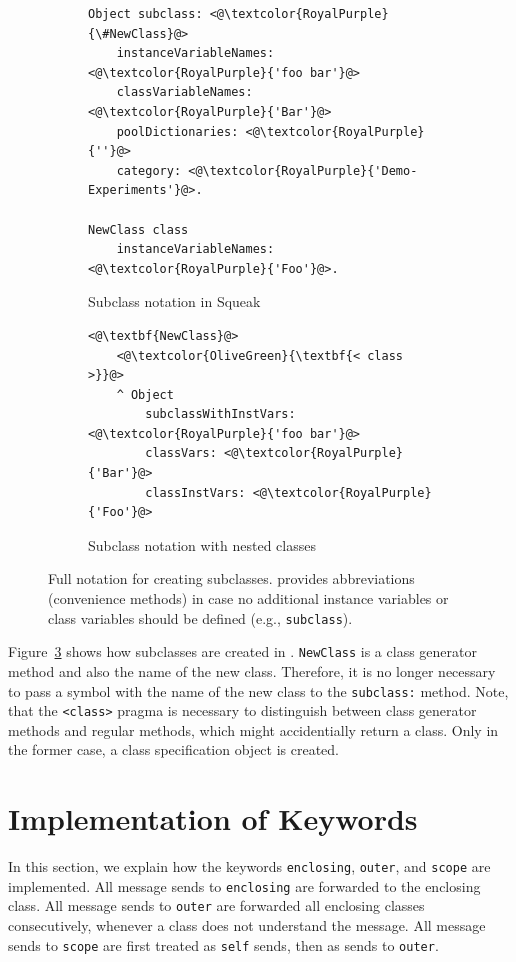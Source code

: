 \begin{figure}[!htp]
\begin{subfigure}[b]{\textwidth}
\begin{lstlisting}
Object subclass: <@\textcolor{RoyalPurple}{\#NewClass}@>
    instanceVariableNames: <@\textcolor{RoyalPurple}{'foo bar'}@>
    classVariableNames: <@\textcolor{RoyalPurple}{'Bar'}@>
    poolDictionaries: <@\textcolor{RoyalPurple}{''}@>
    category: <@\textcolor{RoyalPurple}{'Demo-Experiments'}@>.

NewClass class
	instanceVariableNames: <@\textcolor{RoyalPurple}{'Foo'}@>.
\end{lstlisting}
\caption{Subclass notation in Squeak}
\label{fig:impl_subclass_squeak}
\end{subfigure}

\vspace{15pt}

\begin{subfigure}[b]{\textwidth}
\begin{lstlisting}
<@\textbf{NewClass}@>
    <@\textcolor{OliveGreen}{\textbf{< class >}}@>
    ^ Object 
        subclassWithInstVars: <@\textcolor{RoyalPurple}{'foo bar'}@>
        classVars: <@\textcolor{RoyalPurple}{'Bar'}@>
        classInstVars: <@\textcolor{RoyalPurple}{'Foo'}@>
\end{lstlisting}
\caption{Subclass notation with nested classes}
\label{fig:impl_subclass_nested}
\end{subfigure}
\caption[Notation for creating subclasses]{Full notation for creating subclasses. \msname provides abbreviations (convenience methods) in case no additional instance variables or class variables should be defined (e.g., \texttt{subclass}).}
\end{figure}

Figure~\ref{fig:impl_subclass_nested} shows how subclasses are created in \msname. \texttt{NewClass} is a class generator method and also the name of the new class. Therefore, it is no longer necessary to pass a symbol with the name of the new class to the \texttt{subclass:} method. Note, that the \texttt{<class>} pragma is necessary to distinguish between class generator methods and regular methods, which might accidentially return a class. Only in the former case, a class specification object is created.

\section{Implementation of Keywords}
\label{sec:impl_keywords}
In this section, we explain how the keywords \texttt{enclosing}, \texttt{outer}, and \texttt{scope} are implemented. All message sends to \texttt{enclosing} are forwarded to the enclosing class. All message sends to \texttt{outer} are forwarded all enclosing classes consecutively, whenever a class does not understand the message. All message sends to \texttt{scope} are first treated as \texttt{self} sends, then as sends to \texttt{outer}.

